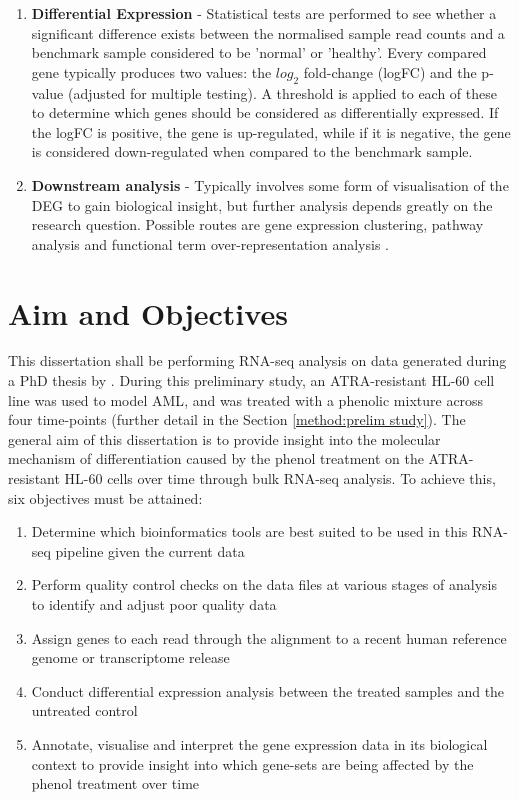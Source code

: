 \begin{enumerate}
\item \textbf{Differential Expression} - Statistical tests are performed to see whether a significant difference exists between the normalised sample read counts and a benchmark sample considered to be 'normal' or 'healthy'. Every compared gene typically produces two values: the $log_{2}$ fold-change (logFC) and the p-value (adjusted for multiple testing). A threshold is applied to each of these to determine which genes should be considered as differentially expressed. If the logFC is positive, the gene is up-regulated, while if it is negative, the gene is considered down-regulated when compared to the benchmark sample.
\item \textbf{Downstream analysis} - Typically involves some form of visualisation of the \ac{DEG} to gain biological insight, but further analysis depends greatly on the research question. Possible routes are gene expression clustering, pathway analysis and functional term over-representation analysis \citep{conesa2016survey, chung2021best}.
\end{enumerate}

\section{Aim and Objectives} 
\label{Aim and Objectives}
This dissertation shall be performing RNA-seq analysis on data generated during a PhD thesis by \cite{Gatt2016}. During this preliminary study, an \ac{ATRA}-resistant HL-60 cell line was used to model \ac{AML}, and was treated with a phenolic mixture across four time-points (further detail in the Section \ref{method:prelim study}). The general aim of this dissertation is to provide insight into the molecular mechanism of differentiation caused by the phenol treatment on the \ac{ATRA}-resistant HL-60 cells over time through bulk RNA-seq analysis. To achieve this, six objectives must be attained:

\begin{enumerate}
\item Determine which bioinformatics tools are best suited to be used in this RNA-seq pipeline given the current data
\item Perform quality control checks on the data files at various stages of analysis to identify and adjust poor quality data
\item Assign genes to each read through the alignment to a recent human reference genome or transcriptome release
\item Conduct differential expression analysis between the treated samples and the untreated control
\item Annotate, visualise and interpret the gene expression data in its biological context to provide insight into which gene-sets are being affected by the phenol treatment over time
\end{enumerate}


